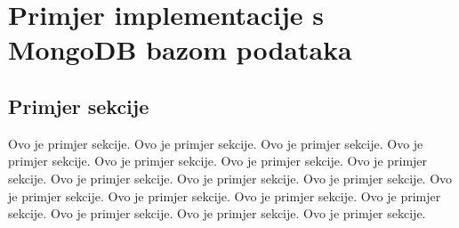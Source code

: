 \chapter{Primjer implementacije s MongoDB bazom podataka}

\section{Primjer sekcije}
Ovo je primjer sekcije. Ovo je primjer sekcije. Ovo je primjer sekcije. Ovo je primjer sekcije. Ovo je primjer sekcije. Ovo je primjer sekcije. Ovo je primjer sekcije. Ovo je primjer sekcije. Ovo je primjer sekcije. Ovo je primjer sekcije. Ovo je primjer sekcije. Ovo je primjer sekcije. Ovo je primjer sekcije. Ovo je primjer sekcije. Ovo je primjer sekcije. Ovo je primjer sekcije. Ovo je primjer sekcije.